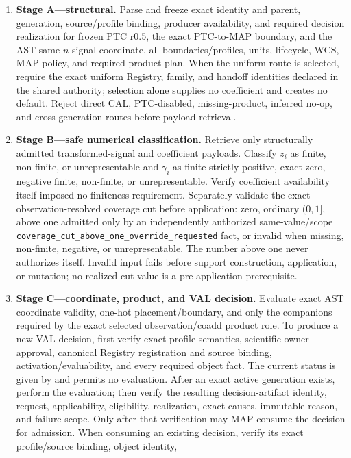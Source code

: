 \documentclass[10pt]{article}
\newcommand{\code}[1]{\nolinkurl{#1}}
\begin{document}
\begin{enumerate}
\item \textbf{Stage A---structural.} Parse and freeze exact identity and
parent, generation, source/profile binding, producer availability, and
required decision realization for frozen PTC r0.5, the exact PTC-to-MAP
boundary, and the AST same-\(n\) signal
coordinate, all boundaries/profiles, units, lifecycle, WCS, MAP policy, and
required-product plan.  When the uniform route is selected, require the exact
uniform Registry, family, and handoff identities declared in the shared
authority; selection alone supplies no coefficient and creates no default.
Reject direct CAL, PTC-disabled, missing-product,
inferred no-op, and cross-generation routes before payload retrieval.
\item \textbf{Stage B---safe numerical classification.} Retrieve only
structurally admitted transformed-signal and coefficient payloads. Classify
\(z_i\) as finite, non-finite, or unrepresentable and \(\gamma_i\) as finite
strictly positive, exact zero, negative finite, non-finite, or
unrepresentable. Verify coefficient availability itself imposed no finiteness
requirement. Separately validate the exact observation-resolved coverage cut
before application: zero, ordinary \((0,1]\), above one admitted only by an
independently authorized same-value/scope
\code{coverage_cut_above_one_override_requested} fact, or invalid when
missing, non-finite, negative, or unrepresentable. The number above one never
authorizes itself. Invalid input fails before support construction, application,
or mutation; no realized cut value is a pre-application prerequisite.
\item \textbf{Stage C---coordinate, product, and VAL decision.} Evaluate exact
AST coordinate validity, one-hot placement/boundary, and only the companions
required by the exact selected observation/coadd product role. To produce a
new VAL decision, first verify exact profile semantics, scientific-owner
approval, canonical Registry registration and source binding,
activation/evaluability, and every required object fact. The current status is
given by \SCIMapCandidateProfileStatusReference{} and permits no evaluation.
After an exact active generation exists, perform the evaluation; then verify
the resulting decision-artifact identity, request, applicability, eligibility,
realization, exact causes, immutable reason, and failure scope. Only after that
verification may MAP consume the decision for admission. When consuming an
existing decision, verify its exact profile/source binding, object identity,

\end{enumerate}
\end{document}
